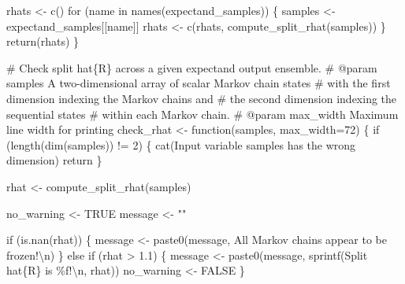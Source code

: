 \documentclass[
  letterpaper,
  DIV=11,
  numbers=noendperiod]{scrartcl}
\newenvironment{Shaded}{\begin{snugshade}}{\end{snugshade}}
\newcommand{\AttributeTok}[1]{\textcolor[rgb]{0.40,0.45,0.13}{#1}}
\newcommand{\CommentTok}[1]{\textcolor[rgb]{0.37,0.37,0.37}{#1}}
\newcommand{\ConstantTok}[1]{\textcolor[rgb]{0.56,0.35,0.01}{#1}}
\newcommand{\ControlFlowTok}[1]{\textcolor[rgb]{0.00,0.23,0.31}{#1}}
\newcommand{\DecValTok}[1]{\textcolor[rgb]{0.68,0.00,0.00}{#1}}
\newcommand{\FloatTok}[1]{\textcolor[rgb]{0.68,0.00,0.00}{#1}}
\newcommand{\FunctionTok}[1]{\textcolor[rgb]{0.28,0.35,0.67}{#1}}
\newcommand{\NormalTok}[1]{\textcolor[rgb]{0.00,0.23,0.31}{#1}}
\newcommand{\OtherTok}[1]{\textcolor[rgb]{0.00,0.23,0.31}{#1}}
\newcommand{\SpecialCharTok}[1]{\textcolor[rgb]{0.37,0.37,0.37}{#1}}
\newcommand{\StringTok}[1]{\textcolor[rgb]{0.13,0.47,0.30}{#1}}
\begin{document}
\begin{Shaded}
\begin{Highlighting}[]
\NormalTok{  rhats }\OtherTok{\textless{}{-}} \FunctionTok{c}\NormalTok{()}
  \ControlFlowTok{for}\NormalTok{ (name }\ControlFlowTok{in} \FunctionTok{names}\NormalTok{(expectand\_samples)) \{}
\NormalTok{    samples }\OtherTok{\textless{}{-}}\NormalTok{ expectand\_samples[[name]]}
\NormalTok{    rhats }\OtherTok{\textless{}{-}} \FunctionTok{c}\NormalTok{(rhats, }\FunctionTok{compute\_split\_rhat}\NormalTok{(samples))}
\NormalTok{  \}}
  \FunctionTok{return}\NormalTok{(rhats)}
\NormalTok{\}}

\CommentTok{\# Check split hat\{R\} across a given expectand output ensemble.}
\CommentTok{\# @param samples A two{-}dimensional array of scalar Markov chain states }
\CommentTok{\#                with the first dimension indexing the Markov chains and }
\CommentTok{\#                the second dimension indexing the sequential states }
\CommentTok{\#                within each Markov chain.}
\CommentTok{\# @param max\_width Maximum line width for printing}
\NormalTok{check\_rhat }\OtherTok{\textless{}{-}} \ControlFlowTok{function}\NormalTok{(samples, }\AttributeTok{max\_width=}\DecValTok{72}\NormalTok{) \{}
  \ControlFlowTok{if}\NormalTok{ (}\FunctionTok{length}\NormalTok{(}\FunctionTok{dim}\NormalTok{(samples)) }\SpecialCharTok{!=} \DecValTok{2}\NormalTok{) \{}
    \FunctionTok{cat}\NormalTok{(}\StringTok{\textquotesingle{}Input variable \textasciigrave{}samples\textasciigrave{} has the wrong dimension\textquotesingle{}}\NormalTok{)}
\NormalTok{    return}
\NormalTok{  \}}

\NormalTok{  rhat }\OtherTok{\textless{}{-}} \FunctionTok{compute\_split\_rhat}\NormalTok{(samples)}

\NormalTok{  no\_warning }\OtherTok{\textless{}{-}} \ConstantTok{TRUE}
\NormalTok{  message }\OtherTok{\textless{}{-}} \StringTok{""}

  \ControlFlowTok{if}\NormalTok{ (}\FunctionTok{is.nan}\NormalTok{(rhat)) \{}
\NormalTok{    message }\OtherTok{\textless{}{-}} \FunctionTok{paste0}\NormalTok{(message, }
                      \StringTok{\textquotesingle{}All Markov chains appear to be frozen!}\SpecialCharTok{\textbackslash{}n}\StringTok{\textquotesingle{}}\NormalTok{)}
\NormalTok{  \} }\ControlFlowTok{else} \ControlFlowTok{if}\NormalTok{ (rhat }\SpecialCharTok{\textgreater{}} \FloatTok{1.1}\NormalTok{) \{}
\NormalTok{    message }\OtherTok{\textless{}{-}} \FunctionTok{paste0}\NormalTok{(message, }\FunctionTok{sprintf}\NormalTok{(}\StringTok{\textquotesingle{}Split hat\{R\} is \%f!}\SpecialCharTok{\textbackslash{}n}\StringTok{\textquotesingle{}}\NormalTok{, rhat))}
\NormalTok{    no\_warning }\OtherTok{\textless{}{-}} \ConstantTok{FALSE}
\NormalTok{  \}}
  

\end{Highlighting}
\end{Shaded}
\end{document}
